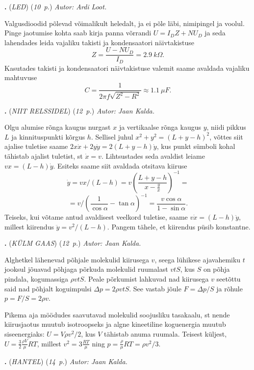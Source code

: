 \documentclass[12pt,a5paper]{article}
\newcommand{\numb}[1]{\vspace{5pt}\textbf{\large #1}}
\newcommand{\nimi}[1]{(\textsl{\small #1})}
\newcommand{\punktid}[1]{(\emph{#1~p.})}
\newcommand{\autor}[1]{\emph{ Autor: #1.}}
\newcounter{ylesanne}
\newcommand{\yl}[1]{\addtocounter{ylesanne}{1}\numb{\theylesanne.} \nimi{#1} \newblock{}}
\begin{document}
\yl{LED} \punktid{10} \autor{Ardi Loot}

Valgusdioodid põlevad võimalikult heledalt, ja ei põle läbi, nimipingel
ja voolul. Pinge jaotumise kohta saab kirja panna võrrandi $U=I_{D}Z+NU_{D}$
ja seda lahendades leida vajaliku takisti ja kondensaatori näivtakistuse 
\begin{equation*}
Z=\frac{U-NU_{D}}{I_{D}}=\SI{2.9}{k\Omega}.
\end{equation*}
Kasutades takisti ja kondensaatori näivtakistuse valemit saame avaldada
vajaliku mahtuvuse
\begin{equation*}
C=\frac{1}{2\pi f\sqrt{Z^{2}-R^{2}}}\approx\SI{1.1}{\mu F}.
\end{equation*}


\yl{NIIT RELSSIDEL} \punktid{12} \autor{Jaan Kalda}

Olgu alumise rõnga kaugus nurgast $x$ ja vertikaalse rõnga kaugus $y$, niidi pikkus $L$ ja kinnituspunkti kõrgus $h$. Sellisel juhul $x^2+y^2=(L+y-h)^2$, võttes siit ajalise tuletise saame $2x\dot x+2y\dot y=2(L+y-h)\dot y$, kus punkt sümboli kohal tähistab ajalist tuletist, st $\dot x=v$. Lihtsustades seda avaldist leiame $vx=(L-h)\dot y$. Esiteks saame siit avaldada otsitava kiiruse
$$
\dot y=vx/(L-h)=v\left(\frac{L+y-h}{x-\frac yx}\right)^{-1}=
$$
$$
=v/(\frac 1{\cos\alpha}-\tan\alpha)^{-1}=\frac{v\cos\alpha}{1-\sin\alpha}.
$$
Teiseks, kui võtame antud avaldisest veelkord tuletise, saame $v\dot x=(L-h)\ddot y$, millest kiirendus $\ddot y=v^2/(L-h)$. Pangem tähele, et kiirendus püsib konstantne.


\yl{KÜLM GAAS} \punktid{12} \autor{Jaan Kalda}

Alghetkel lähenevad põhjale molekulid kiirusega $v$, seega lühikese ajavahemiku $t$ jooksul jõuavad põhjaga põrkuda molekulid ruumalast $vtS$, kus $S$ on põhja pindala, kogumassiga $\rho vtS$. Peale põrkumist lahkuvad nad kiirusega $v$ seetõttu said nad põhjalt koguimpulsi $\Delta p=2\rho vtS$. See vastab jõule $F=\Delta p/S$ ja rõhule $p=F/S=2\rho v$.

Pikema aja möödudes saavutavad molekulid soojusliku tasakaalu, st nende kiirusjaotus muutub isotroopseks ja algne kineetiline koguenergia muutub siseenergiaks: $U=V\rho v^2/2$, kus $V$ tähistab anuma ruumala. Teisest küljest, $U=\frac 32 \frac{\rho V}\mu RT$, millest $v^2=3 \frac{ RT}\mu$ ning $p=\frac{\rho}\mu RT=\rho v^2/3$.



\yl{HANTEL} \punktid{14} \autor{Jaan Kalda}
\end{document}
